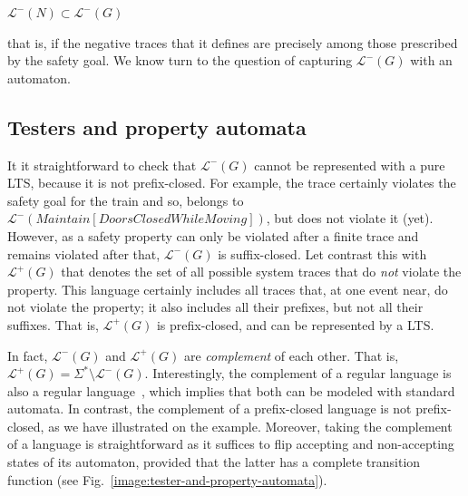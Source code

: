 \begin{center}
$\mathcal{L}^{-}(N) \subset \mathcal{L}^{-}(G)$
\end{center}

\noindent that is, if the negative traces that it defines are precisely among those prescribed by the safety goal. We know turn to the question of capturing $\mathcal{L}^{-}(G)$ with an automaton.

\subsection{Testers and property automata}

It it straightforward to check that $\mathcal{L}^{-}(G)$ cannot be represented with a pure LTS, because it is not prefix-closed. For example, the trace  certainly violates the safety goal for the train and so, belongs to $\mathcal{L}^{-}(Maintain[DoorsClosed While Moving])$, but  does not violate it (yet). However, as a safety property can only be violated after a finite trace and remains violated after that, $\mathcal{L}^{-}(G)$ is suffix-closed. Let contrast this with $\mathcal{L}^{+}(G)$ that denotes the set of all possible system traces that do \emph{not} violate the property. This language certainly includes all traces that, at one event near, do not violate the property; it also includes all their prefixes, but not all their suffixes. That is, $\mathcal{L}^{+}(G)$ is prefix-closed, and can be represented by a LTS. 

In fact, $\mathcal{L}^{-}(G)$ and $\mathcal{L}^{+}(G)$ are \emph{complement} of each other. That is, $\mathcal{L}^{+}(G) = \Sigma^{*} \setminus \mathcal{L}^{-}(G)$. Interestingly, the complement of a regular language is also a regular language~\cite{Hopcroft:1979}, which implies that both can be modeled with standard automata. In contrast, the complement of a prefix-closed language is not prefix-closed, as we have illustrated on the example. Moreover, taking the complement of a language is straightforward as it suffices to flip accepting and non-accepting states of its automaton, provided that the latter has a complete transition function (see Fig.~\ref{image:tester-and-property-automata}). 

